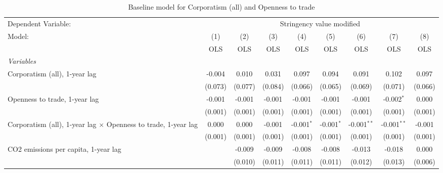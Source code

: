 
\begin{table}[htbp]
   \caption{Baseline model for Corporatism (all) and Openness to trade}
   \centering
   \begin{tabular}{lcccccccc}
      \toprule
      Dependent Variable: & \multicolumn{8}{c}{Stringency value modified}\\
      Model:                                                                & (1)     & (2)     & (3)         & (4)           & (5)           & (6)           & (7)           & (8)\\  
                                                                            &  OLS    & OLS     & OLS         & OLS           & OLS           & OLS           & OLS           & OLS\\  
      \midrule
      \emph{Variables}\\
      Corporatism (all), 1-year lag                                         & -0.004  & 0.010   & 0.031       & 0.097         & 0.094         & 0.091         & 0.102         & 0.097\\   
                                                                            & (0.073) & (0.077) & (0.084)     & (0.066)       & (0.065)       & (0.069)       & (0.071)       & (0.066)\\   
      Openness to trade, 1-year lag                                         & -0.001  & -0.001  & -0.001      & -0.001        & -0.001        & -0.001        & -0.002$^{*}$  & 0.000\\   
                                                                            & (0.001) & (0.001) & (0.001)     & (0.001)       & (0.001)       & (0.001)       & (0.001)       & (0.001)\\   
      Corporatism (all), 1-year lag $\times$ Openness to trade, 1-year lag  & 0.000   & 0.000   & -0.001      & -0.001$^{*}$  & -0.001$^{*}$  & -0.001$^{**}$ & -0.001$^{**}$ & -0.001\\   
                                                                            & (0.001) & (0.001) & (0.001)     & (0.001)       & (0.001)       & (0.001)       & (0.001)       & (0.001)\\   
      CO2 emissions per capita, 1-year lag                                  &         & -0.009  & -0.009      & -0.008        & -0.008        & -0.013        & -0.018        & 0.000\\   
                                                                            &         & (0.010) & (0.011)     & (0.011)       & (0.011)       & (0.012)       & (0.013)       & (0.006)\\   

\end{tabular}
\end{table}
